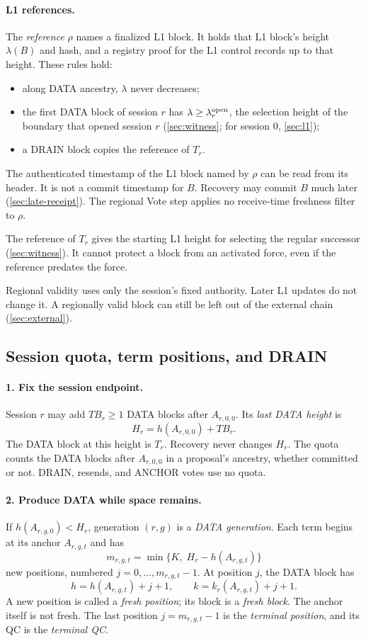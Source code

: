 \documentclass[11pt,a4paper]{article}
\newcommand{\TB}{\mathit{TB}}
\newcommand{\defterm}[1]{\textcolor{rrBlue}{\textit{#1}}}
\begin{document}
\paragraph{L1 references.}
The \defterm{reference} $\rho$ names a finalized L1 block. It holds that L1
block's height $\lambda(B)$ and hash, and a registry proof for the L1
control records up to that height. These rules hold:
\begin{itemize}
\item along DATA ancestry, $\lambda$ never decreases;
\item the first DATA block of session $r$ has $\lambda\ge
\lambda^{\rm open}_r$, the selection height of the boundary that opened
session $r$ (\cref{sec:witness}; for session $0$, \cref{sec:l1});
\item a DRAIN block copies the reference of $T_r$.
\end{itemize}
The authenticated timestamp of the L1 block named by $\rho$ can be
read from its header. It is not a commit timestamp for $B$. Recovery
may commit $B$ much later (\cref{sec:late-receipt}). The
regional Vote step applies no receive-time freshness filter to $\rho$.

The reference of $T_r$ gives the starting L1 height for selecting the
regular successor (\cref{sec:witness}). It cannot protect a block from
an activated force, even if the reference predates the force.

Regional validity uses only the session's fixed authority. Later L1
updates do not change it. A regionally valid block can still be left out
of the external chain (\cref{sec:external}).

\subsection{Session quota, term positions, and DRAIN}
\label{sec:quota}
\paragraph{1. Fix the session endpoint.}
Session $r$ may add $\TB_r\ge1$ DATA blocks after $A_{r,0,0}$. Its \defterm{last
DATA height} is
\[
 H_r=h(A_{r,0,0})+\TB_r.
\]
The DATA block at this height is $T_r$. Recovery never changes $H_r$.
The quota counts the DATA blocks after $A_{r,0,0}$ in a proposal's
ancestry, whether committed or not. DRAIN, resends, and ANCHOR votes
use no quota.

\paragraph{2. Produce DATA while space remains.}
If $h(A_{r,g,0})<H_r$, generation $(r,g)$ is a \defterm{DATA generation}.
Each term begins at its anchor $A_{r,g,t}$ and has
\[
 m_{r,g,t}=\min\{K,\;H_r-h(A_{r,g,t})\}
\]
new positions, numbered $j=0,\ldots,m_{r,g,t}-1$. At position $j$, the
DATA block has
\[
 h=h(A_{r,g,t})+j+1,\qquad
 k=k_r(A_{r,g,t})+j+1.
\]
A new position is called a \defterm{fresh position}; its block is a
\defterm{fresh block}. The anchor itself is not fresh. The last position
$j=m_{r,g,t}-1$ is the \defterm{terminal position}, and its QC is the
\defterm{terminal QC}.
\end{document}
